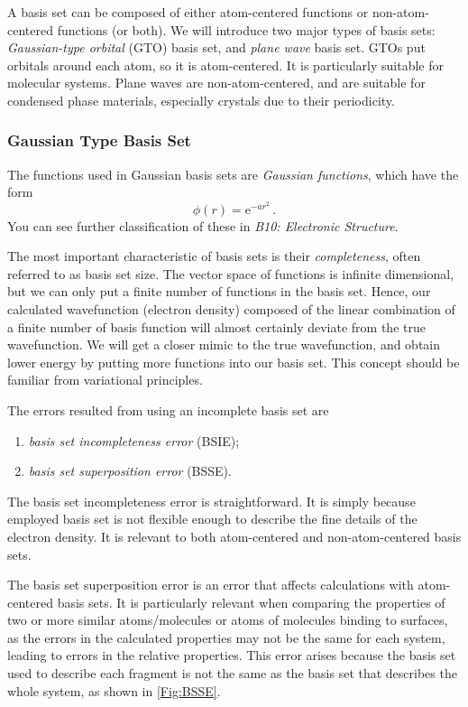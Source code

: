 \documentclass{article}
\theoremstyle{plain}\theoremheaderfont{\normalfont\itshape}\theorembodyfont{\rmfamily}\theoremseparator{.}\newtheorem*{rem}{Remark}\newtheorem*{ex}{Example}\newtheorem*{proof}{Proof}\newtheorem*{altp}{Alternative proof}
\theoremstyle{plain}\theoremheaderfont{\normalfont\bfseries}\theorembodyfont{\rmfamily}\theoremseparator{.}\newtheorem{thm}{Theorem}[section]\newtheorem{lem}[thm]{Lemma}\newtheorem{prop}[thm]{Proposition}\newtheorem*{cor}{Corollary}\newtheorem{defn}[thm]{Definition}\newtheorem{clm}[thm]{Claim}\newtheorem{clminproof}{Claim}\newtheorem{pos}{Postulate}[section]
\theoremstyle{break}\theoremheaderfont{\normalfont\itshape}\theorembodyfont{\rmfamily}\theoremseparator{.\medskip}\newtheorem*{proofskip}{Proof}\newtheorem*{exs}{Examples}\newtheorem*{rems}{Remarks}
\theoremstyle{break}\theoremheaderfont{\normalfont\bfseries}\theorembodyfont{\rmfamily}\theoremseparator{.\medskip}\newtheorem{lemskip}[thm]{Lemma}\newtheorem{defnskip}[thm]{Definition}\newtheorem{propskip}[thm]{Proposition}\newtheorem{thmskip}[thm]{Theorem}
\numberwithin{equation}{section}
\newcommand{\ee}{\mathrm{e}}
\begin{document}
    A basis set can be composed of either atom-centered functions or non-atom-centered functions (or both). We will introduce two major types of basis sets: \textit{Gaussian-type orbital} (GTO) basis set, and \textit{plane wave} basis set. GTOs put orbitals around each atom, so it is atom-centered. It is particularly suitable for molecular systems. Plane waves are non-atom-centered, and are suitable for condensed phase materials, especially crystals due to their periodicity.

    \subsubsection{Gaussian Type Basis Set}
    The functions used in Gaussian basis sets are \textit{Gaussian functions}, which have the form
    \begin{equation}
        \phi(r)=\ee^{-ar^2}\,.
    \end{equation}
    You can see further classification of these in \textit{B10: Electronic Structure}.

    The most important characteristic of basis sets is their \textit{completeness}, often referred to as basis set size. The vector space of functions is infinite dimensional, but we can only put a finite number of functions in the basis set. Hence, our calculated wavefunction (electron density) composed of the linear combination of a finite number of basis function will almost certainly deviate from the true wavefunction. We will get a closer mimic to the true wavefunction, and obtain lower energy by putting more functions into our basis set. This concept should be familiar from variational principles.

    The errors resulted from using an incomplete basis set are
    \begin{enumerate}[topsep=0pt,label=(\roman*)]
        \item \textit{basis set incompleteness error} (BSIE);
        \item \textit{basis set superposition error} (BSSE).
    \end{enumerate}

    The basis set incompleteness error is straightforward. It is simply because employed basis set is not flexible enough to describe the fine details of the electron density. It is relevant to both atom-centered and non-atom-centered basis sets.

    The basis set superposition error is an error that affects calculations with atom-centered basis sets. It is particularly relevant when comparing the properties of two or more similar atoms/molecules or atoms of molecules binding to surfaces, as the errors in the calculated properties may not be the same for each system, leading to errors in the relative properties. This error arises because the basis set used to describe each fragment is not the same as the basis set that describes the whole system, as shown in \cref{Fig:BSSE}.
\end{document}
